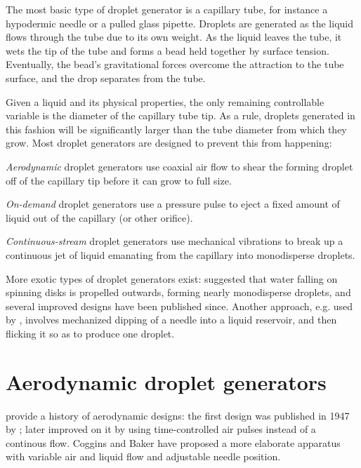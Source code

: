 \documentclass[11.5pt]{book}
\begin{document}
The most basic type of droplet generator is a capillary tube, for instance a
hypodermic needle or a pulled glass pipette. Droplets are generated as the
liquid flows through the tube due to its own weight. As the liquid leaves the
tube, it wets the tip of the tube and forms a bead held together by surface
tension. Eventually, the bead's gravitational forces overcome the attraction to
the tube surface, and the drop separates from the tube.

Given a liquid and its physical properties, the only remaining controllable
variable is the diameter of the capillary tube tip. As a rule, droplets
generated in this fashion will be significantly larger than the tube diameter
from which they grow. Most droplet generators are designed to prevent this from
happening:
\begin{alist}
\item \emph{Aerodynamic} droplet generators use coaxial air flow to shear the
    forming droplet off of the capillary tip before it can grow to full size.
\item \emph{On-demand} droplet generators use a pressure pulse to eject a fixed
    amount of liquid out of the capillary (or other orifice).
\item \emph{Continuous-stream} droplet generators use mechanical vibrations to
    break up a continuous jet of liquid emanating from the capillary into
    monodisperse droplets.
\end{alist}
More exotic types of droplet generators exist: \citet{Walton49} suggested that
water falling on spinning disks is propelled outwards, forming nearly
monodisperse droplets, and several improved designs have been published since.
Another approach, e.g. used by \citet{Merritt77}, involves mechanized dipping of
a needle into a liquid reservoir, and then flicking it so as to produce one
droplet.

\section{Aerodynamic droplet generators}
\citet{Allan88} provide a history of aerodynamic designs: the first design was
published in 1947 by \citet{Lane47}; \citet{Reil69} later improved on it by
using time-controlled air pulses instead of a continous flow. Coggins and Baker
\cite{Coggins83} have proposed a more elaborate apparatus with variable air and liquid
flow and adjustable needle position.
\end{document}
